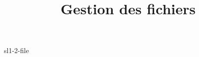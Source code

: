 \documentclass {beamer}
\title {Gestion des fichiers}
\begin{document}
 {sl1-2-file}
\end{document}

